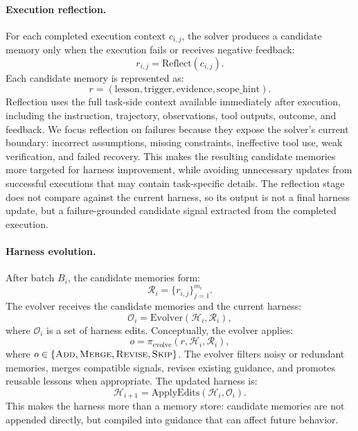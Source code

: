 \paragraph{Execution reflection.}
For each completed execution context $c_{i,j}$, the solver produces a candidate memory only when the execution fails or receives negative feedback:
\begin{equation}
    r_{i,j}
    =
    \mathrm{Reflect}(c_{i,j}).
\end{equation}
Each candidate memory is represented as:
\begin{equation}
    r
    =
    (\mathrm{lesson}, \mathrm{trigger}, \mathrm{evidence}, \mathrm{scope\_hint}).
\end{equation}
Reflection uses the full task-side context available immediately after execution, including the instruction, trajectory, observations, tool outputs, outcome, and feedback. We focus reflection on failures because they expose the solver's current boundary: incorrect assumptions, missing constraints, ineffective tool use, weak verification, and failed recovery. This makes the resulting candidate memories more targeted for harness improvement, while avoiding unnecessary updates from successful executions that may contain task-specific details. The reflection stage does not compare against the current harness, so its output is not a final harness update, but a failure-grounded candidate signal extracted from the completed execution.

\paragraph{Harness evolution.}
After batch $B_i$, the candidate memories form:
\begin{equation}
    \mathcal{R}_i
    =
    \{r_{i,j}\}_{j=1}^{m_i}.
\end{equation}
The evolver receives the candidate memories and the current harness:
\begin{equation}
    \mathcal{O}_i
    =
    \mathrm{Evolver}(\mathcal{H}_i, \mathcal{R}_i),
\end{equation}
where $\mathcal{O}_i$ is a set of harness edits. Conceptually, the evolver applies:
\begin{equation}
    o
    =
    \pi_{\mathrm{evolve}}(r, \mathcal{H}_i, \mathcal{R}_i),
\end{equation}
where $o \in \{\textsc{Add}, \textsc{Merge}, \textsc{Revise}, \textsc{Skip}\}$. The evolver filters noisy or redundant memories, merges compatible signals, revises existing guidance, and promotes reusable lessons when appropriate. The updated harness is:
\begin{equation}
    \mathcal{H}_{i+1}
    =
    \mathrm{ApplyEdits}(\mathcal{H}_i, \mathcal{O}_i).
\end{equation}
This makes the harness more than a memory store: candidate memories are not appended directly, but compiled into guidance that can affect future behavior.

